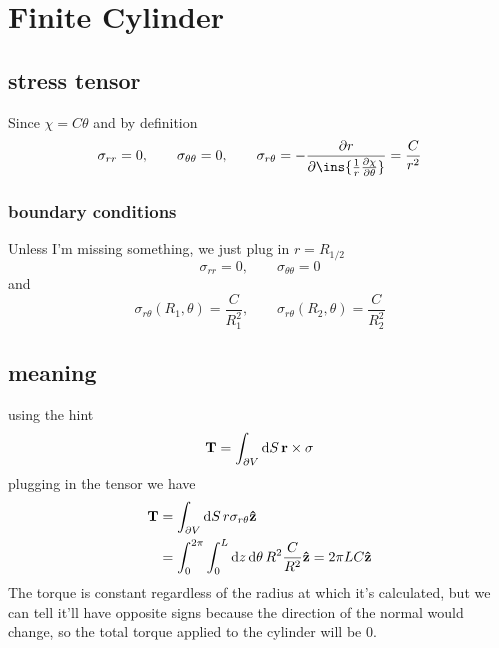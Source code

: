 \clearpage
\section{Finite Cylinder}
\subsection{stress tensor}
Since \(\chi=C\theta\) and by definition
\begin{equation}
    \sigma_{rr}=0,\qquad\sigma_{\theta\theta}=0,\qquad\sigma_{r\theta}=-\pdv{r}\ins{\frac{1}{r}\pdv{\chi}{\theta}}=\frac{C}{r^2}
\end{equation}
\subsubsection{boundary conditions}
Unless I'm missing something, we just plug in \(r=R_{1/2}\)
\begin{equation}
    \sigma_{rr}=0,\qquad \sigma_{\theta\theta}=0
\end{equation}
and 
\begin{equation}
    \sigma_{r\theta}(R_1,\theta)=\frac{C}{R_1^2},\qquad\sigma_{r\theta}(R_2,\theta)=\frac{C}{R_2^2}
\end{equation}
\subsection{meaning}
using the hint 
\begin{equation}
    \vb{T}=\int_{\partial V}\dd{S}\vb{r}\times\sigma
\end{equation}
plugging in the tensor we have 
\begin{align}
    \vb{T}&=\int_{\partial V}\dd{S}r\sigma_{r\theta}\vu{z}\\
    &= \int_{0}^{2\pi}\int_{0}^{L}\dd{z}\dd{\theta}R^2\frac{C}{R^2}\vu{z}=2\pi L C \vu{z}
\end{align}
The torque is constant regardless of the radius at which it's calculated, but we can tell it'll have opposite signs because the direction of the normal would change, so the total torque applied to the cylinder will be 0.